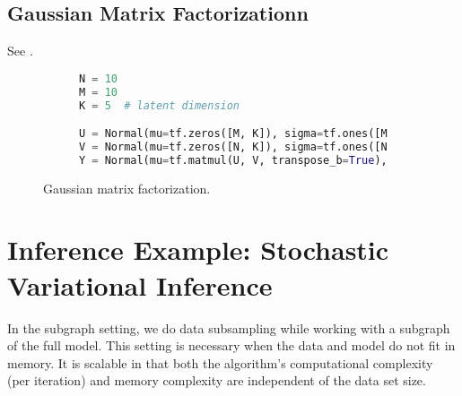\subsection{Gaussian Matrix Factorizationn}
\label{appendix:gaussian_mf}

See .

\begin{figure}[!h]
\begin{subfigure}{0.3\columnwidth}
  \centering
  
\end{subfigure}%
\begin{subfigure}{0.7\columnwidth}
\begin{lstlisting}[language=python]
N = 10
M = 10
K = 5  # latent dimension

U = Normal(mu=tf.zeros([M, K]), sigma=tf.ones([M, K]))
V = Normal(mu=tf.zeros([N, K]), sigma=tf.ones([N, K]))
Y = Normal(mu=tf.matmul(U, V, transpose_b=True), sigma=tf.ones([N, M]))
\end{lstlisting}
\end{subfigure}
\caption{Gaussian matrix factorization.}
\label{fig:gaussian_mf}
\end{figure}

\section{Inference Example: Stochastic Variational Inference}
\label{appendix:svi}

In the subgraph setting, we do data subsampling while working with a
subgraph of the full model. This setting is necessary when the data
and model do not fit in memory.
It is scalable in that both the
algorithm's computational complexity (per iteration) and memory
complexity are independent of the data set size.

